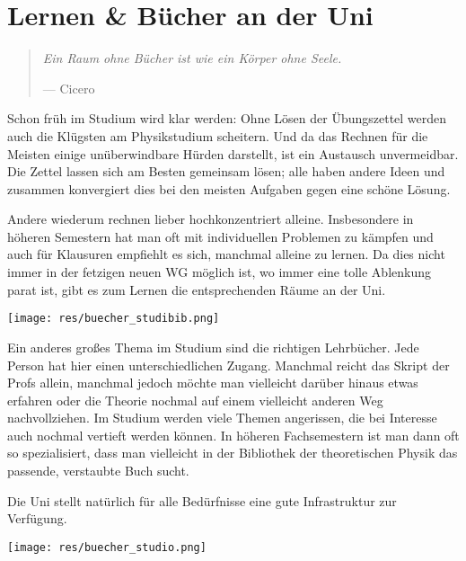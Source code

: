 \section{Lernen \& Bücher an der Uni}
\begin{multicols}{2}
\begin{quote}
	\textit{Ein Raum ohne Bücher ist wie ein Körper ohne Seele.}
	
	\hfill--- Cicero
\end{quote}
Schon früh im Studium wird klar werden: Ohne Lösen der Übungszettel werden auch die Klügsten am Physikstudium scheitern.
Und da das Rechnen für die Meisten einige unüberwindbare Hürden darstellt, ist ein Austausch unvermeidbar.
Die Zettel lassen sich am Besten gemeinsam lösen; alle haben andere Ideen und zusammen konvergiert dies bei den meisten Aufgaben gegen eine schöne Lösung.

Andere wiederum rechnen lieber hochkonzentriert alleine.
Insbesondere in höheren Semestern hat man oft mit individuellen Problemen zu kämpfen und auch für Klausuren empfiehlt es sich, manchmal alleine zu lernen.
Da dies nicht immer in der fetzigen neuen WG möglich ist, wo immer eine tolle Ablenkung parat ist, gibt es zum Lernen die entsprechenden Räume an der Uni.

\texttt{[image: res/buecher\_studibib.png]}

Ein anderes großes Thema im Studium sind die richtigen Lehrbücher.
Jede Person hat hier einen unterschiedlichen Zugang.
Manchmal reicht das Skript der Profs allein, manchmal jedoch möchte man vielleicht darüber hinaus etwas erfahren oder die Theorie nochmal auf einem vielleicht anderen Weg nachvollziehen.
Im Studium werden viele Themen angerissen, die bei Interesse auch nochmal vertieft werden können.
In höheren Fachsemestern ist man dann oft so spezialisiert, dass man vielleicht in der Bibliothek der theoretischen Physik das passende, verstaubte Buch sucht.

Die Uni stellt natürlich für alle Bedürfnisse eine gute Infrastruktur zur Verfügung.

\texttt{[image: res/buecher\_studio.png]}


\end{multicols}
